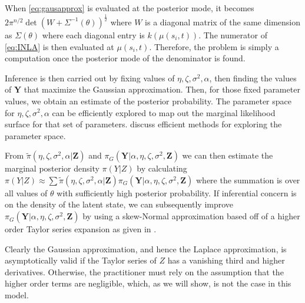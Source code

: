 \documentclass[11pt]{isuthesis}
\begin{document}
	When \eqref{eq:gausapprox} is evaluated at the posterior mode, it becomes $2 \pi^{n/2} \det (W+\Sigma^{-1}(\theta))^{\frac{1}{2}}$ where $W$ is a diagonal matrix of the same dimension as $\Sigma(\theta)$ where each diagonal entry is $k(\mu(s_i,t))$.  The numerator of \eqref{eq:INLA} is then evaluated at $\mu(s_i,t)$.  Therefore, the problem is simply a computation once the posterior mode of the denominator is found.
	
	Inference is then carried out by fixing values of $\eta,\zeta,\sigma^2,\alpha$, then finding the values of $\boldsymbol{Y}$ that maximize the Gaussian approximation.  Then, for those fixed parameter values, we obtain an estimate of the posterior probability.  The parameter space for $\eta,\zeta,\sigma^2,\alpha$ can be efficiently explored to map out the marginal likelihood surface for that set of parameters.  \cite{rue2009approximate} discuss efficient methods for exploring the parameter space.
	
	From $\tilde{\pi}(\eta,\zeta,\sigma^2,\alpha|\boldsymbol{Z})$ and $\pi_G(\boldsymbol{Y}|\alpha,\eta,\zeta,\sigma^2,\boldsymbol{Z})$ we can then estimate the marginal posterior density $\pi(Y|Z)$ by calculating $\pi(Y|Z) \approx \sum\tilde{\pi}(\eta,\zeta,\sigma^2,\alpha|\boldsymbol{Z})\pi_G(\boldsymbol{Y}|\alpha,\eta,\zeta,\sigma^2,\boldsymbol{Z})$ where the summation is over all values of $\theta$ with sufficiently high posterior probability.  If inferential concern is on the density of the latent state, we can subsequently improve $\pi_G(\boldsymbol{Y}|\alpha,\eta,\zeta,\sigma^2,\boldsymbol{Z})$ by using a skew-Normal approximation based off of a higher order Taylor series expansion as given in \cite{rue2009approximate}.  
	
	Clearly the Gaussian approximation, and hence the Laplace approximation, is asymptotically valid if the Taylor series of $Z$ has a vanishing third and higher derivatives.  Otherwise, the practitioner must rely on the assumption that the higher order terms are negligible, which, as we will show, is not the case in this model.
	
\end{document}

